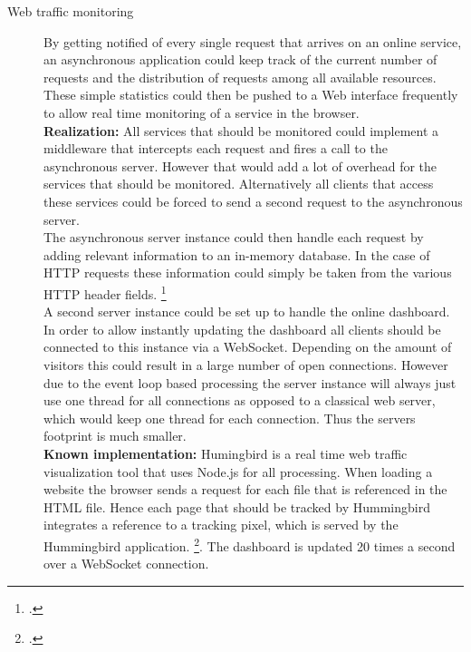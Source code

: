 \begin{description}
  \item[Web traffic monitoring] By getting notified of every single request that
  arrives on an online service, an asynchronous application could keep track of the
  current number of requests and the distribution of requests among all
  available resources. These simple statistics could then be pushed to a Web interface
  frequently to allow real time monitoring of a service in the browser.\\
  \textbf{Realization:} All services that should be monitored could implement a
  middleware that intercepts each request and fires a call to the asynchronous
  server. However that would add a lot of overhead for the services that should
  be monitored. Alternatively all clients that access these services could be forced to send a
  second request to the asynchronous server.\\
  The asynchronous server instance could then handle each request by adding
  relevant information to an in-memory database. In the case of HTTP requests
  these information could simply be taken from the various HTTP header fields.
  \footcite[Cf.][]{http_rfc}\\
  A second server instance could
  be set up to handle the online dashboard.
  In order to allow instantly updating the dashboard all clients should be
  connected to this instance via a WebSocket. Depending on the amount of visitors
  this could result in a large number of open connections. However due to the
  event loop based processing the server instance will always just use one
  thread for all connections as opposed to a classical web server, which would
  keep one thread for each connection. Thus the servers footprint is much
  smaller.\\
  \textbf{Known implementation:} Humingbird is a real time web traffic
  visualization tool that uses Node.js for all processing. When loading a
  website the browser sends a request for each file that is referenced in the
  HTML file. Hence each page that should be tracked by Hummingbird integrates a
  reference to a tracking pixel, which is served by the Hummingbird application.
  \footcite[Cf.][]{hummingbird}. The dashboard is updated 20 times a second
  over a WebSocket connection.
  

\end{description}
